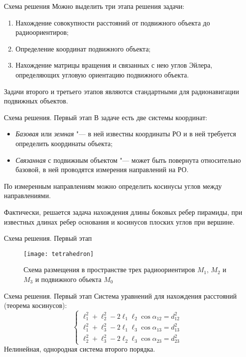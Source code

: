 \documentclass[russian,hyperref={unicode}]{beamer}
\begin{document}
  \begin{frame}{Схема решения}
    Можно выделить три этапа решения задачи:
    \begin{enumerate}
        \item Нахождение совокупности расстояний от подвижного объекта до радиоориентиров;
        \item Определение координат подвижного объекта;
        \item Нахождение матрицы вращения и связанных с нею углов Эйлера, определяющих угловую ориентацию подвижного объекта.
    \end{enumerate}
    Задачи второго и третьего этапов являются стандартными для радионавигации подвижных объектов.
  \end{frame}

  \begin{frame}{Схема решения. Первый этап}
    В задаче есть две системы координат:
    \begin{itemize}
      \item \textit{Базовая} или \textit{земная} "--- в ней известны координаты РО и в ней требуется определить координаты объекта;
      \item \textit{Связанная} с подвижным объектом "--- может быть повернута относительно базовой, в ней проводятся измерения направлений на РО.
    \end{itemize}

    По измеренным направлениям можно определить косинусы углов между направлениями.

    Фактически, решается задача нахождения длины боковых ребер пирамиды, при известных длинах ребер основания и косинусов плоских углов при вершине.
  \end{frame}

  \begin{frame}{Схема решения. Первый этап}
    \begin{figure}
      \begin{center}
        \texttt{[image: tetrahedron]}

        \caption{Схема размещения в пространстве трех радиоориентиров $M_1$, $M_2$ и $M_3$ и подвижного объекта $M_0$}
        \label{fig:tetrahedron}
      \end{center}
    \end{figure}
  \end{frame}

  \begin{frame}{Схема решения. Первый этап}
    Система уравнений для нахождения расстояний (теорема косинусов):
    \begin{equation} \label{eq:system}
      \begin{cases}
        \ell_1^2 + \ell_2^2 - 2 \ell_1 \ell_2 \cos\alpha_{12} = d_{12}^2 \\
        \ell_1^2 + \ell_3^2 - 2 \ell_1 \ell_3 \cos\alpha_{13} = d_{13}^2 \\
        \ell_2^2 + \ell_3^2 - 2 \ell_2 \ell_3 \cos\alpha_{23} = d_{23}^2
      \end{cases}
    \end{equation}
    Нелинейная, однородная система второго порядка.
  \end{frame}
\end{document}
